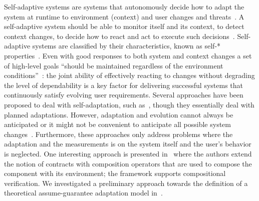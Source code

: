 \documentclass[12pt]{article}
\begin{document}
Self-adaptive systems are systems that autonomously decide how to adapt the system at runtime to environment (context) and user changes and threats~\cite{BSG09,DG13}. A self-adaptive system should be able to monitor itself and its context, to detect context changes, to decide how to react and act to execute such decisions~\cite{ST09}. Self-adaptive systems are classified by their characteristics, known as self-* properties~\cite{KC03,BJM05}. Even with good responses to both system and context changes a set of high-level goals ``should be maintained regardless of the environment conditions''~\cite{CG08}: the joint ability of effectively reacting to changes without degrading the level of dependability is a key factor for delivering successful systems that continuously satisfy evolving user requirements. Several approaches have been proposed to deal with self-adaptation, such as~\cite{terBeek2015,BE10,BA12,Bucchiarone2015}, though they essentially deal with planned adaptations. However, adaptation and evolution cannot always be anticipated or it might not be convenient to anticipate all possible system changes~\cite{ACD11,G10,G12}. Furthermore, these approaches only address problems where the adaptation and the measurements is on the system itself and the user's behavior is neglected. One interesting approach is presented in~\cite{QG08} where the authors extend the notion of contracts with composition operators that are used to compose the component with its environment; the framework supports compositional verification. We investigated a preliminary approach towards the definition of a theoretical assume-guarantee adaptation model in~\cite{IPT09}.
\end{document}
